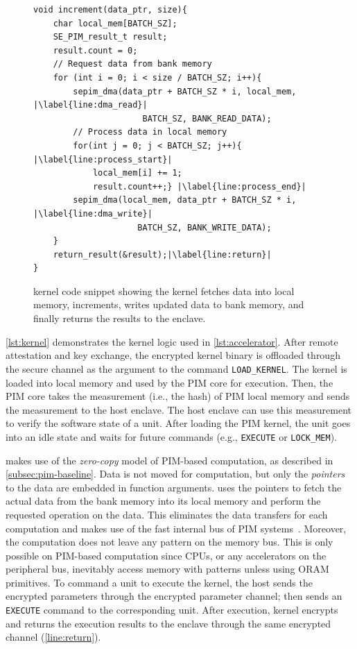 \begin{figure}[h]
    \centering
    \begin{verbatim}
void increment(data_ptr, size){
    char local_mem[BATCH_SZ];
    SE_PIM_result_t result;
    result.count = 0;
    // Request data from bank memory 
    for (int i = 0; i < size / BATCH_SZ; i++){
        sepim_dma(data_ptr + BATCH_SZ * i, local_mem, |\label{line:dma_read}|
                      BATCH_SZ, BANK_READ_DATA);
        // Process data in local memory
        for(int j = 0; j < BATCH_SZ; j++){ |\label{line:process_start}|
            local_mem[i] += 1; 
            result.count++;} |\label{line:process_end}|
        sepim_dma(local_mem, data_ptr + BATCH_SZ * i, |\label{line:dma_write}|
                     BATCH_SZ, BANK_WRITE_DATA);
    }
    return_result(&result);|\label{line:return}|
}
\end{verbatim}
    \caption{\thename kernel code snippet showing the kernel fetches data into local memory, increments, writes updated data to bank memory, and finally returns the results to the enclave.}
    \label{lst:kernel}
\end{figure}

\autoref{lst:kernel} demonstrates the kernel logic used in \autoref{lst:accelerator}. 
After remote attestation and key exchange, the encrypted \thename kernel binary is offloaded through the secure channel as the argument to the command \texttt{LOAD\_KERNEL}. The kernel is loaded into \thename local memory and used by the PIM core for execution. Then, the PIM core takes the measurement (i.e., the hash) of PIM local memory and sends the measurement to the host enclave. The host enclave can use this measurement to verify the software state of a \thename unit. After loading the PIM kernel, the \thename unit goes into an idle state and waits for future commands (e.g., \texttt{EXECUTE} or \texttt{LOCK\_MEM}). 

\thename makes use of the \emph{zero-copy} model of PIM-based computation, as described in \cref{subsec:pim-baseline}. Data is not moved for computation, but only the \emph{pointers} to the data are embedded in function arguments. \thename uses the pointers to fetch the actual data from the bank memory into its local memory and perform the requested operation on the data. This eliminates the data transfers for each computation and makes use of the fast internal bus of PIM systems~\cite{hmc,primer-on-pim}. Moreover, the computation does not leave any pattern on the memory bus. This is only possible on PIM-based computation since CPUs, or any accelerators on the peripheral bus, inevitably access memory with patterns unless using ORAM primitives. To command a \thename unit to execute the kernel, the host sends the encrypted parameters through the encrypted parameter channel; then sends an \texttt{EXECUTE} command to the corresponding \thename unit. After execution, \thename kernel encrypts and returns the execution results to the enclave through the same encrypted channel (\ref{line:return}).

